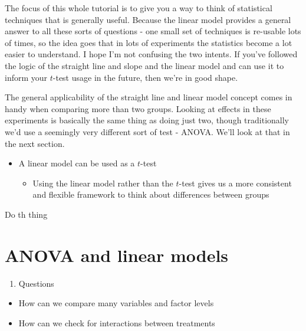 \documentclass[
]{book}
\providecommand{\tightlist}{%
  \setlength{\itemsep}{0pt}\setlength{\parskip}{0pt}}
\newenvironment{task}
{ \begin{tcolorbox}[title=For you to do,title filled] }
{  \end{tcolorbox} }
\newenvironment{roundup}
{ \begin{tcolorbox}[colbacktitle=yellow!50!white,
title=Round Up,coltitle=black,
fonttitle=\bfseries] }
{  \end{tcolorbox} }
\begin{document}
The focus of this whole tutorial is to give you a way to think of statistical techniques that is generally useful. Because the linear model provides a general answer to all these sorts of questions - one small set of techniques is re-usable lots of times, so the idea goes that in lots of experiments the statistics become a lot easier to understand. I hope I'm not confusing the two intents. If you've followed the logic of the straight line and slope and the linear model and can use it to inform your \(t\)-test usage in the future, then we're in good shape.

The general applicability of the straight line and linear model concept comes in handy when comparing more than two groups. Looking at effects in these experiments is basically the same thing as doing just two, though traditionally we'd use a seemingly very different sort of test - ANOVA. We'll look at that in the next section.

\begin{roundup}
\begin{itemize}
\tightlist
\item
  A linear model can be used as a \(t\)-test

  \begin{itemize}
  \tightlist
  \item
    Using the linear model rather than the \(t\)-test gives us a more consistent and flexible framework to think about differences between groups
  \end{itemize}
\end{itemize}
\end{roundup}

\begin{task}
Do th thing
\end{task}

\hypertarget{anova-and-linear-models}{%
\chapter{ANOVA and linear models}\label{anova-and-linear-models}}

\begin{enumerate}
\def\labelenumi{\arabic{enumi}.}
\tightlist
\item
  Questions
\end{enumerate}

\begin{itemize}
\tightlist
\item
  How can we compare many variables and factor levels
\item
  How can we check for interactions between treatments
\end{itemize}
\end{document}

